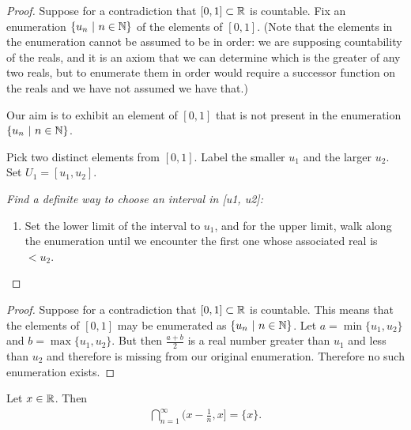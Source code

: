 \begin{proof}
  Suppose for a contradiction that $[0, 1] \subset \mathbb{R}$ is countable. Fix an enumeration $\{u_n ~|~ n \in \mathbb{N}\}$
  of the elements of $[0, 1]$. (Note that the elements in the enumeration cannot be assumed to be in order: we
  are supposing countability of the reals, and it is an axiom that we can determine which is the greater of any
  two reals, but to enumerate them in order would require a successor function on the reals and we have not
  assumed we have that.)

  Our aim is to exhibit an element of $[0, 1]$ that is not present in the enumeration$\{u_n ~|~ n \in \mathbb{N}\}$.

  Pick two distinct elements from $[0, 1]$. Label the smaller $u_1$ and the larger $u_2$. Set $U_1 = [u_1, u_2]$.

  {\it Find a definite way to choose an interval in [u1, u2]:}
  \begin{enumerate}
  \item Set the lower limit of the interval to $u_1$, and for the upper limit, walk along the enumeration until we
    encounter the first one whose associated real is $< u_2$.
  \end{enumerate}



\end{proof}


\begin{proof}
  Suppose for a contradiction that $[0, 1] \subset \mathbb{R}$ is countable. This means that the elements of $[0, 1]$
  may be enumerated as $\{u_n ~|~ n \in \mathbb{N}\}$. Let $a = \min\{u_1, u_2\}$ and $b = \max\{u_1, u_2\}$. But
  then $\frac{a + b}{2}$ is a real number greater than $u_1$ and less than $u_2$ and therefore is missing from
  our original enumeration. Therefore no such enumeration exists.


\end{proof}




\begin{lemma}
  Let $x \in \mathbb{R}$. Then
      \begin{align*}
      \bigcap_{n=1}^\infty \Big(x -\frac{1}{n}, x\Big] = \{x\}.
    \end{align*}
\end{lemma}

